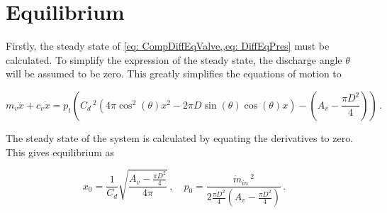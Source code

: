 \section{Equilibrium}





Firstly, the steady state of \cref{eq: CompDiffEqValve,,eq: DiffEqPres} must be calculated. To simplify the expression of the steady state, the discharge angle $\theta$ will be assumed to be zero. This greatly simplifies the equations of motion to

\begin{equation} \label{eq: ClosingDiffEqFull}
    m_v \ddot{x} + c_v \dot{x} = p_t \left(
    C_d \,^2 \left( 4 \pi \cos^2(\theta) x^2
    - 2 \pi D \sin(\theta) \cos(\theta) x \right)
    - \left( A_v - \frac{\pi D^2}{4} \right)
    \right) \, .
\end{equation}

The steady state of the system is calculated by equating the derivatives to zero. This gives equilibrium as

\begin{equation*}
    x_0 = \frac{1}{C_d} \sqrt{\frac{A_v - \frac{\pi D^2}{4}}{4 \pi}}
    \, , \quad
    p_0 = \frac{\dot{m}_{in} \,^2}{2 \frac{\pi D^2}{4} \left( A_v - \frac{\pi D^2}{4} \right)} \, .
\end{equation*}




